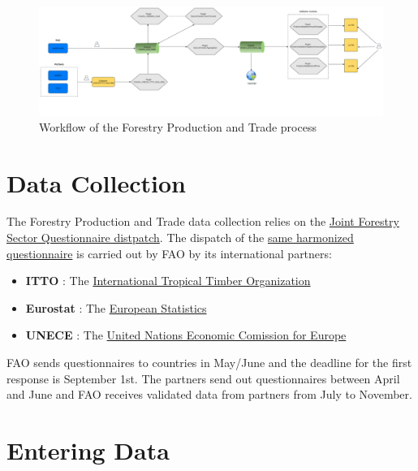 \documentclass[
]{book}
\providecommand{\tightlist}{%
  \setlength{\itemsep}{0pt}\setlength{\parskip}{0pt}}
\begin{document}
\begin{figure}

{\centering \includegraphics[width=1\linewidth]{images/Forestry_workflow} 

}

\caption{Workflow of the Forestry Production and Trade process}\label{fig:forestryWorkflow}
\end{figure}

\hypertarget{data-collection}{%
\section{\texorpdfstring{\textbf{Data Collection}}{Data Collection}}\label{data-collection}}

The Forestry Production and Trade data collection relies on the \href{http://www.fao.org/forestry/statistics/jfsq/en/}{Joint Forestry Sector Questionnaire distpatch}. The dispatch of the \href{http://www.fao.org/forestry/statistics/jfsq/en/}{same harmonized questionnaire} is carried out by FAO by its international partners:

\begin{itemize}
\tightlist
\item
  \textbf{ITTO} : The \href{https://www.itto.int/}{International Tropical Timber Organization}
\item
  \textbf{Eurostat} : The \href{https://ec.europa.eu/eurostat}{European Statistics}
\item
  \textbf{UNECE} : The \href{http://www.unece.org/info/ece-homepage.html}{United Nations Economic Comission for Europe}
\end{itemize}

FAO sends questionnaires to countries in May/June and the deadline for the first response is September 1st. The partners send out questionnaires between April and June and FAO receives validated data from partners from July to November.

\hypertarget{entering-data}{%
\section{\texorpdfstring{\textbf{Entering Data}}{Entering Data}}\label{entering-data}}
\end{document}
